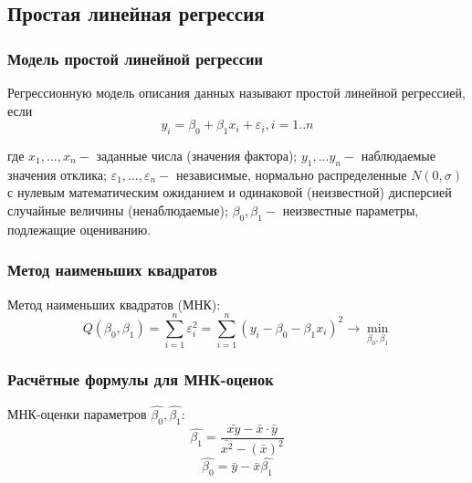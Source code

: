 \subsection{Простая линейная регрессия}
	\subsubsection{Модель простой линейной регрессии}
	Регрессионную модель описания данных называют простой линейной регрессией, если
	\begin{equation}
	    y_{i} = \beta_{0} + \beta_{1}x_{i} + \varepsilon_{i},  i = 1..n
	    \label{eq:y_i}
	\end{equation}

	\noindent где $x_1,...,x_n - $ заданные числа (значения фактора);
	$y_1,...y_n - $ наблюдаемые значения отклика;
	$\varepsilon_1,...,\varepsilon_n - $ независимые, нормально распределенные $N(0, \sigma)$ с нулевым математическим ожиданием и одинаковой (неизвестной) дисперсией случайные величины (ненаблюдаемые);
	$\beta_0, \beta_1 - $ неизвестные параметры, подлежащие оцениванию.


	\subsubsection{Метод наименьших квадратов}
    Метод наименьших квадратов (МНК):
	\begin{equation}
	    Q(\beta_{0}, \beta_{1}) = \sum_{i=1}^{n}{\varepsilon_{i}^{2}} =
	    \sum_{i=1}^{n}{(y_{i} - \beta_{0} - \beta_{1}x_{i})^{2}}\rightarrow \min_{\beta_{0}, \beta_{1}}
	    \label{eq:q_beta}
	\end{equation}


	\subsubsection{Расчётные формулы для МНК-оценок}
	\noindent МНК-оценки параметров $\hat{\beta_0}, \hat{\beta_1}$:
	\begin{equation}
	    \hat{\beta_{1}} = \frac{\bar{xy} - \bar{x} \cdot \bar{y}}{\bar{x^{2}} - (\bar{x})^{2}}
	    \label{eq:beta_1_new}
	\end{equation}
	\begin{equation}
	    \hat{\beta_{0}} = \bar{y} - \bar{x}\hat{\beta_{1}}
	    \label{eq:beta_0_new}
	\end{equation}


